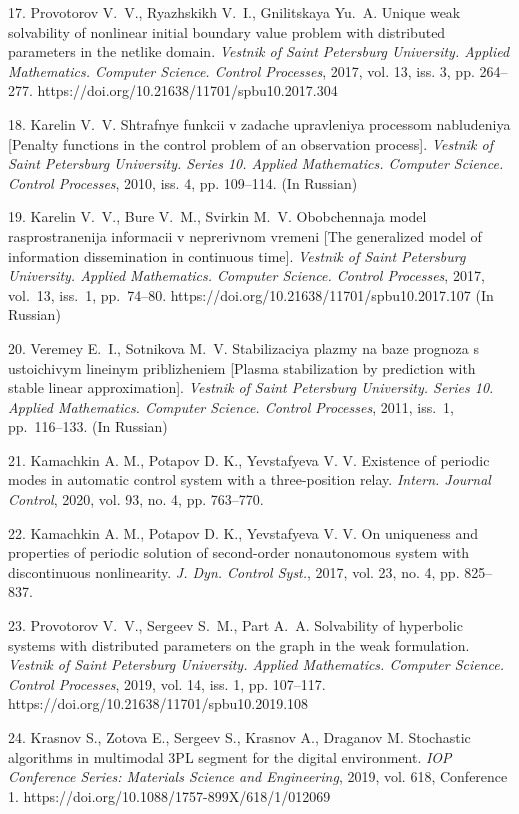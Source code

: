 {17. Provotorov V.~V., Ryazhskikh V.~I., Gnilitskaya Yu.~A.  Unique weak solvability of nonlinear initial boundary value problem with distributed parameters in the netlike domain. \emph{Vestnik of Saint Petersburg University. Applied Mathematics. Computer Science. Control Processes}, 2017, vol. 13, iss. 3, pp. 264--277. https://doi.org/10.21638/11701/spbu10.2017.304

18.	Karelin V.~V.  Shtrafnye funkcii v zadache upravleniya processom nabludeniya [Penalty functions in the control problem of an observation process]. \emph{Vestnik of Saint Petersburg University. Series 10. Applied Mathematics. Computer Science. Control Processes}, 2010, iss. 4, pp. 109--114. (In Russian)

19. Karelin V.~V., Bure V.~M., Svirkin M.~V. Obobchennaja model rasprostranenija informacii v neprerivnom vremeni [The generalized model of information dissemination in continuous time]. \textit{Vestnik of Saint Petersburg University. Applied Mathematics. Computer Science. Control Processes}, 2017, vol.~13, iss.~1, pp.~74--80. https://doi.org/10.21638/11701/spbu10.2017.107 (In Russian)

20.	Veremey E.~I., Sotnikova M.~V. Stabilizaciya plazmy na baze prognoza s ustoichivym lineinym priblizheniem [Plasma stabilization by prediction with stable linear approximation]. \emph{Vestnik of Saint Petersburg University. Series 10. Applied Mathematics. Computer Science. Control Processes}, 2011, iss.~1, pp.~116--133. (In Russian)

21.	Kamachkin A. M., Potapov D. K., Yevstafyeva V. V. Existence of periodic modes in automatic control system with a three-position relay. \emph{Intern. Journal Control}, 2020, vol. 93, no. 4, pp. 763--770.

22. Kamachkin A. M., Potapov D. K., Yevstafyeva V. V. On uniqueness and properties of periodic solution of second-order nonautonomous system with discontinuous nonlinearity. \emph{J. Dyn. Control Syst.}, 2017, vol. 23, no. 4, pp. 825--837.

23. Provotorov V.~V., Sergeev S.~M., Part A.~A. Solvability of hyperbolic systems with distributed parameters on the graph in the weak formulation. \emph{Vestnik of Saint Petersburg University. Applied Mathematics. Computer Science. Control Processes}, 2019, vol. 14, iss. 1, pp. 107--117.\\
https://doi.org/10.21638/11701/spbu10.2019.108

24. Krasnov S., Zotova E., Sergeev S., Krasnov A., Draganov M. Stochastic algorithms in multimodal 3PL segment for the digital environment. \emph{IOP Conference Series: Materials Science and Engineering}, 2019, vol. 618, Conference 1. https://doi.org/10.1088/1757-899X/618/1/012069

}
